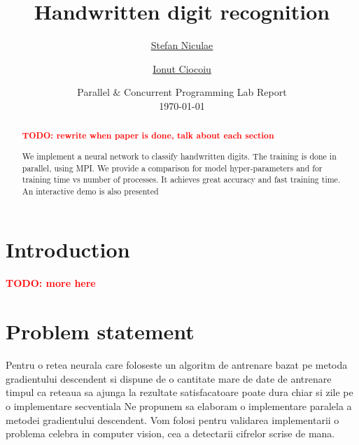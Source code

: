 \documentclass[a4paper]{article}
\newcommand{\TODO}[1]{\noindent \textbf{\textcolor{red}{TODO: #1}}}
\begin{document}
	\title{
	\Huge Handwritten digit recognition
	}
	
	\vspace{2cm}
	
	\author{\Large \href{mailto:stefan.niculae@my.fmi.unibuc.ro}{Stefan Niculae} \and \Large \href{mailto:ionut.ciocoiu@my.fmi.unibuc.ro}{Ionut Ciocoiu}
	\vspace{3cm}}
	
	\date{
	\large Parallel \& Concurrent Programming Lab Report \\
    \vspace{0.2cm}
	\today
	}

	\maketitle

\vspace{5cm}
\begin{abstract}
\TODO{rewrite when paper is done, talk about each section}

We implement a neural network to classify handwritten digits. The training is done in parallel, using MPI. We provide a comparison for model hyper-parameters and for training time vs number of processes. It achieves great accuracy and fast training time. An interactive demo is also presented
\end{abstract}






\newpage
\section{Introduction}
\TODO{more here}


\section{Problem statement}
\label{sec:problem}
Pentru o retea neurala care foloseste un algoritm de antrenare bazat pe metoda gradientului descendent si dispune de o cantitate mare de date de antrenare timpul ca reteaua sa ajunga la rezultate satisfacatoare poate dura chiar si zile pe o implementare secventiala
Ne propunem sa elaboram o implementare paralela a metodei gradientului descendent. Vom folosi pentru validarea implementarii o problema celebra in computer vision, cea a detectarii cifrelor scrise de mana.
\end{document}
